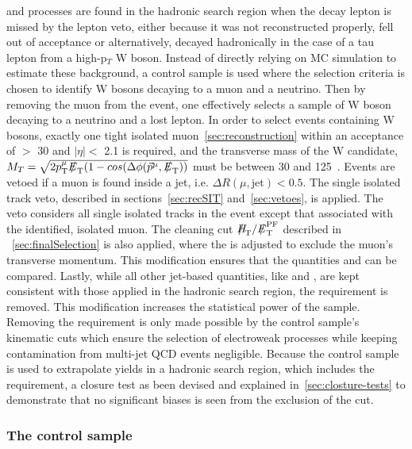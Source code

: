 \wj and \ttbar processes are found in the hadronic search region 
when the decay lepton is missed by the lepton veto, either 
because it was not reconstructed properly, fell out of acceptance 
or alternatively, decayed hadronically in the case of a tau lepton 
from a high-p$_{T}$ W boson. Instead of directly relying on MC 
simulation to estimate these background, a \mj control sample is 
used where the selection criteria is chosen to identify W bosons 
decaying to a muon and a neutrino. Then by removing the muon from 
the event, one effectively selects a sample of W boson decaying to 
a neutrino and a lost lepton. In order to select events containing 
W bosons, exactly one tight isolated muon~\ref{sec:reconstruction} 
within an acceptance of \PT $>$ 30 \gev and $|\eta| <$ 2.1 is required, 
and the transverse mass of the W candidate, 
$M_{T} = \sqrt{2\pt^{\mu}\met(1-cos(\Delta\phi(\vec{p}^{\rm  \mu},\met))}$ 
must be between 30 and 125~\gev.  Events are vetoed if a muon is found inside
a jet, i.e. $\Delta R(\mu,\textrm{jet}) < 0.5$. The single isolated track 
veto, described in sections~\ref{sec:recSIT} and~\ref{sec:vetoes}, is applied. 
The veto considers all single isolated tracks in the event except 
that associated with the identified, isolated muon. The cleaning cut 
$\mht/\pfmet$ described in ~\ref{sec:finalSelection} is also applied, 
where the \pfmet is adjusted to exclude the muon's transverse momentum.
This modification ensures that the quantities \mht and \pfmet can be 
compared. Lastly, while all other jet-based quantities, like \scalht 
and \mht, are kept consistent with those applied in the hadronic 
search region, the \alphat requirement is removed. This modification 
increases the statistical power of the sample. Removing the \alphat 
requirement is only made possible by the control sample's kinematic 
cuts which ensure the selection of electroweak processes while keeping
contamination from multi-jet QCD events negligible. Because the control 
sample is used to extrapolate yields in a hadronic search region, 
which includes the \alphat requirement, a closure test as been devised 
and explained in~\ref{sec:closture-tests} to demonstrate that no 
significant biases is seen from the exclusion of the \alphat cut.

\subsubsection{The \texorpdfstring{\gj}{photon plus jets} control sample}

